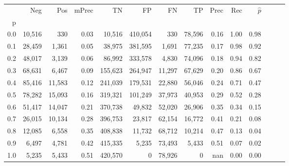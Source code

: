 \begin{tabular}{rrrrrrrrrrrrrr}
\toprule
{} &     Neg &     Pos & mPrec &       TN &       FP &      FN &      TP &  Prec &   Rec & $\hat{p}$ \\
p   &         &         &       &          &          &         &         &       &       &           \\
\midrule
0.0 &  10,516 &     330 &  0.03 &   10,516 &  410,054 &     330 &  78,596 &  0.16 &  1.00 &      0.98 \\
0.1 &  28,459 &   1,361 &  0.05 &   38,975 &  381,595 &   1,691 &  77,235 &  0.17 &  0.98 &      0.92 \\
0.2 &  48,017 &   3,139 &  0.06 &   86,992 &  333,578 &   4,830 &  74,096 &  0.18 &  0.94 &      0.82 \\
0.3 &  68,631 &   6,467 &  0.09 &  155,623 &  264,947 &  11,297 &  67,629 &  0.20 &  0.86 &      0.67 \\
0.4 &  85,416 &  11,583 &  0.12 &  241,039 &  179,531 &  22,880 &  56,046 &  0.24 &  0.71 &      0.47 \\
0.5 &  78,282 &  15,093 &  0.16 &  319,321 &  101,249 &  37,973 &  40,953 &  0.29 &  0.52 &      0.28 \\
0.6 &  51,417 &  14,047 &  0.21 &  370,738 &   49,832 &  52,020 &  26,906 &  0.35 &  0.34 &      0.15 \\
0.7 &  26,015 &  10,134 &  0.28 &  396,753 &   23,817 &  62,154 &  16,772 &  0.41 &  0.21 &      0.08 \\
0.8 &  12,085 &   6,558 &  0.35 &  408,838 &   11,732 &  68,712 &  10,214 &  0.47 &  0.13 &      0.04 \\
0.9 &   6,497 &   4,781 &  0.42 &  415,335 &    5,235 &  73,493 &   5,433 &  0.51 &  0.07 &      0.02 \\
1.0 &   5,235 &   5,433 &  0.51 &  420,570 &        0 &  78,926 &       0 &   nan &  0.00 &      0.00 \\
\bottomrule
\end{tabular}
